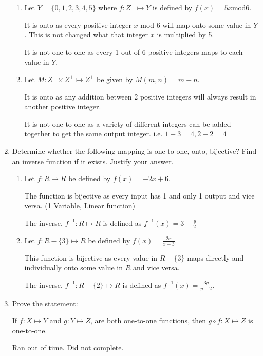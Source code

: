 \documentclass[12pt,letterpaper,titlepage]{article}
\begin{document}
\begin{raggedright}
\begin{enumerate}
\begin{enumerate}[label=(\alph*)]
\item Let $Y = \{0, 1, 2, 3, 4, 5\}$ where $f : Z^+\mapsto Y$ is defined by $f(x) = 5x \text{mod} 6$.

It is onto as every positive integer $x$ mod 6 will map onto some value in $Y$. This is not changed what that integer $x$ is multiplied by 5.

It is not one-to-one as every 1 out of 6 positive integers maps to each value in $Y$.

\item Let $M : Z^+ \times Z^+ \mapsto Z^+$ be given by $M(m, n) = m + n$.

It is onto as any addition between 2 positive integers will always result in another positive integer.

It is not one-to-one as a variety of different integers can be added together to get the same output integer. i.e. $1+3 = 4, 2+2 = 4$

\end{enumerate}

\item Determine whether the following mapping is one-to-one, onto, bijective? Find an inverse function if it exists. Justify your answer.

\begin{enumerate}[label=(\alph*)]
\item Let $f : R \mapsto R$ be defined by $f(x) = −2x + 6$.

The function is bijective as every input has 1 and only 1 output and vice versa. (1 Variable, Linear function)

The inverse,  $f^{-1} : R \mapsto R$ is defined as $f^{-1}(x) = 3 - \frac{y}{2}$

\item Let $f : R − \{3\} \mapsto R$ be defined by $f(x) = \frac{2x}{x − 3}$.

This function is bijective as every value in $R-\{3\}$ maps directly and individually onto some value in $R$ and vice versa.

The inverse, $f^{-1} : R − \{2\} \mapsto R$ is defined as $f^{-1}(x) = \frac{3y}{y-2}$.

\end{enumerate}

\item Prove the statement:

If $f : X \mapsto Y$ and $g : Y \mapsto Z$, are both one-to-one functions, then $g \circ f : X \mapsto Z$ is one-to-one.

\underline{Ran out of time. Did not complete.}
\end{enumerate}
\end{raggedright}
\end{document}

